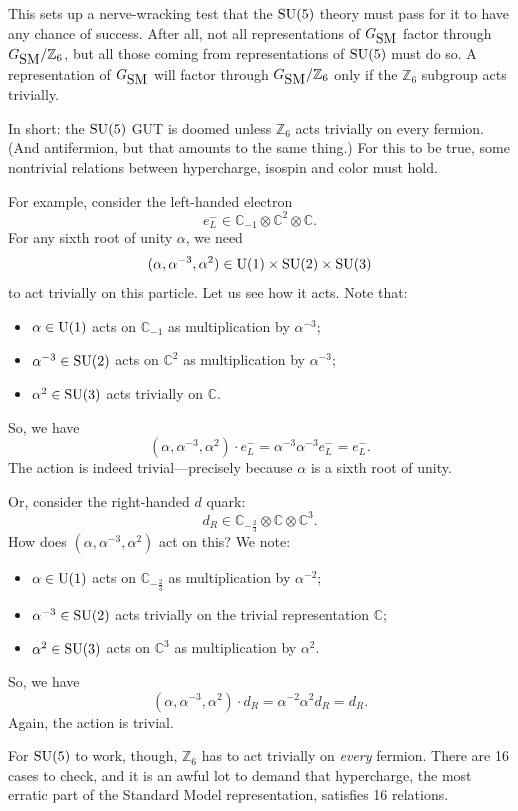 \documentclass[12pt]{article}
\newcommand{\C}{{\mathbb C}}  %
\newcommand{\Z}{{\mathbb Z}}  %
\newcommand{\U}{{\rm U}}    %
\newcommand{\SU}{{\rm SU}}    %
\newcommand{\twothirds}{\frac{2}{3}} %
\newcommand{\GSM}{{G_{\mbox{\rm SM}}}}  %
\begin{document}
This sets up a nerve-wracking test that the $\SU(5)$ theory must pass
for it to have any chance of success.  After all, not all
representations of $\GSM$ factor through $\GSM/\Z_6$, but all those
coming from representations of $\SU(5)$ must do so.  A representation
of $\GSM$ will factor through $\GSM/\Z_6$ only if the $\Z_6$ subgroup acts
trivially.

In short: the $\SU(5)$ GUT is doomed unless $\Z_6$ acts trivially on
every fermion.  (And antifermion, but that amounts to the same thing.)
For this to be true, some nontrivial relations between hypercharge, 
isospin and color must hold.

For example, consider the left-handed electron
\[ e^-_L \in \C_{-1} \otimes \C^2 \otimes \C .\]
For any sixth root of unity $\alpha$, we need
\[ (\alpha, \alpha^{-3}, \alpha^2) \in \U(1) \times \SU(2) \times \SU(3) \]
to act trivially on this particle.  Let us see how it acts.  Note that:
\begin{itemize}
\item
$\alpha \in \U(1)$ acts on $\C_{-1}$ as multiplication by $\alpha^{-3}$;
\item 
$\alpha^{-3} \in \SU(2)$ acts on $\C^2$ as multiplication by $\alpha^{-3}$;
\item 
$\alpha^2 \in \SU(3)$ acts trivially on $\C$.
\end{itemize}
So, we have 
\[ (\alpha, \alpha^{-3}, \alpha^2) \cdot e^-_L = 
\alpha^{-3} \alpha^{-3} e^-_L = e^-_L .\]
The action is indeed trivial---precisely because 
$\alpha$ is a sixth root of unity.

Or, consider the right-handed $d$ quark:
\[ d_R \in \C_{-\twothirds} \otimes \C \otimes \C^3. \]
How does $(\alpha, \alpha^{-3}, \alpha^2)$ act on this?
We note:
\begin{itemize}
\item
$\alpha \in \U(1)$ acts on $\C_{-\twothirds}$ as multiplication by 
$\alpha^{-2}$;
\item 
$\alpha^{-3} \in \SU(2)$ acts trivially on the trivial representation
$\C$;
\item 
$\alpha^2 \in \SU(3)$ acts on $\C^3$ as multiplication by $\alpha^2$.
\end{itemize}
So, we have
\[ (\alpha, \alpha^{-3}, \alpha^2) \cdot d_R 
= \alpha^{-2} \alpha^2 d_R = d_R .\]
Again, the action is trivial.

For $\SU(5)$ to work, though, $\Z_6$ has to act trivially on \emph{every}
fermion.  There are 16 cases to check, and it is an awful lot to demand that
hypercharge, the most erratic part of the Standard Model 
representation, satisfies 16 relations.
\end{document}
